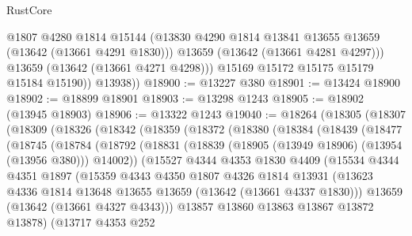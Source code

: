 \begin{lexlean}{RustCore}
\begin{coremodule}
                @1807
                @4280
                @1814
                @15144
                (@13830 @4290 @1814 @13841 @13655 @13659 (@13642 (@13661 @4291 @1830)))
                @13659
                (@13642 (@13661 @4281 @4297)))
              @13659
              (@13642 (@13661 @4271 @4298)))
            @15169
            @15172
            @15175
            @15179
            @15184
            @15190))
        @13938))
@18900 := @13227 @380
@18901 := @13424 @18900
@18902 := @18899 @18901
@18903 := @13298 @1243
@18905 := @18902 (@13945 @18903)
@18906 := @13322 @1243
@19040 := @18264
    (@18305
      (@18307
        (@18309
          (@18326
            (@18342
              (@18359
                (@18372
                  (@18380
                    (@18384
                      (@18439
                        (@18477
                          (@18745
                            (@18784
                              (@18792
                                (@18831
                                  (@18839 (@18905 (@13949 @18906) (@13954 (@13956 @380))) @14002))
                                (@15527
                                  @4344
                                  @4353
                                  @1830
                                  @4409
                                  (@15534
                                    @4344
                                    @4351
                                    @1897
                                    (@15359
                                      @4343
                                      @4350
                                      @1807
                                      @4326
                                      @1814
                                      @13931
                                      (@13623
                                        @4336
                                        @1814
                                        @13648
                                        @13655
                                        @13659
                                        (@13642 (@13661 @4337 @1830)))
                                      @13659
                                      (@13642 (@13661 @4327 @4343)))
                                    @13857
                                    @13860
                                    @13863
                                    @13867
                                    @13872
                                    @13878)
                                  (@13717
                                    @4353
                                    @252

\end{coremodule}
\end{lexlean}
